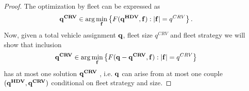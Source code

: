\documentclass[a4paper,11pt]{article}
\begin{document}
\begin{proof}
The optimization by fleet can be expressed as
\begin{equation}
\label{eq_qcav}
\bold{q^{CRV}} \in \arg \min_{\bold{f}} \left\{F(\bold{q^{HDV}},\bold{f}): |\bold{f}| = q^{CRV}\right\}.
\end{equation} 
Now, given a total vehicle assignment $\bold{q}$, fleet size $q^{CRV}$ and fleet strategy we will show that inclusion
\begin{equation}
\label{eq_qCAV}
\bold{q^{CRV}} \in \arg \min_{\bold{f}} \left\{F(\bold{q} - \bold{q^{CRV}}, \bold{f}): |\bold{f}| = q^{CRV} \right\}
\end{equation}
has at most one solution $\bold{q^{CRV}}$ , i.e. $\bold{q}$ can arise from at most one couple $(\bold{q^{HDV}}, \bold{q^{CRV}})$ conditional on fleet strategy and size. 


\end{proof}
\end{document}

